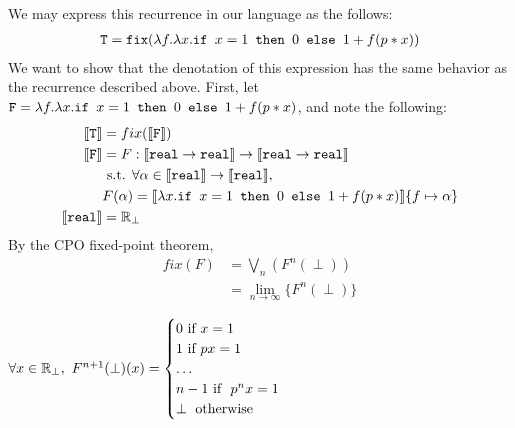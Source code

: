 We may express this recurrence in our language as the follows:
\begin{align*}
\texttt{T} = \texttt{fix}(\lambda f. \lambda x.\texttt{if } x=1 \texttt{ then } 0 \texttt{ else } 1 + f(p*x))
 \end{align*}
 We want to show that the denotation of this expression has the same behavior as the recurrence described above. 
 First, let $\texttt{F} =\lambda f. \lambda x.\texttt{if } x=1 \texttt{ then } 0 \texttt{ else } 1 + f(p*x)$, and note the following: 
 \begin{align*}
 \llbracket \texttt{T} \rrbracket &= fix(\llbracket \texttt{F} \rrbracket) \\
 \llbracket \texttt{F} \rrbracket &= F : \llbracket \texttt{real} \rightarrow \texttt{real}\rrbracket \rightarrow \llbracket \texttt{real} \rightarrow \texttt{real}\rrbracket \\ 
 &\text{ s.t. } \forall \alpha \in \llbracket \texttt{real}\rrbracket \rightarrow \llbracket \texttt{real} \rrbracket, \\   
 &F(\alpha) = \llbracket\lambda x.\texttt{if } x=1 \texttt{ then } 0 \texttt{ else } 1 + f(p*x)\rrbracket\{f \mapsto \alpha\} \\
 \llbracket \texttt{real}\rrbracket &= \mathbb{R}_{\perp}  
 \end{align*}
 By the CPO fixed-point theorem,  
\begin{align*}
 fix(F) &= \bigvee_n(F^n (\perp)) \\
&= \lim_{n \to \infty}\{F^n (\perp)\}
 \end{align*}
 \begin{lemma}
 $\forall x \in \R_{\perp}, \ F^{n+1}(\perp)(x) =  
 \begin{cases}
 0 \text{ if } x = 1 \\
 1 \text{ if } px = 1 \\
 \dots \\
 n - 1 \text{ if } \ p^{n}x = 1  \\
 \perp \text{ otherwise}
 \end{cases}$
 \end{lemma}
